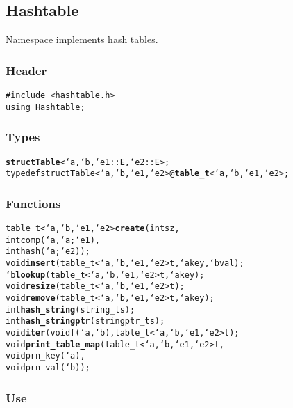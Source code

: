 \subsection{Hashtable}

Namespace  implements hash tables.

\subsubsection*{Header}
\begin{verbatim}
#include <hashtable.h>
using Hashtable;
\end{verbatim}

\subsubsection*{Types}
\begin{alltt}
\textbf{struct Table}<`a,`b,`e1::E,`e2::E>;
typedef struct Table<`a,`b,`e1,`e2> @\textbf{table_t}<`a,`b,`e1,`e2>;
\end{alltt}

\subsubsection*{Functions}

\begin{alltt}
table_t<`a,`b,`e1,`e2> \textbf{create}(int sz,
                              int comp(`a,`a;`e1),
                              int hash(`a;`e2));
void                   \textbf{insert}(table_t<`a,`b,`e1,`e2> t, `a key, `b val);
`b                     \textbf{lookup}(table_t<`a,`b,`e1,`e2> t, `a key);
void                   \textbf{resize}(table_t<`a,`b,`e1,`e2> t);
void                   \textbf{remove}(table_t<`a,`b,`e1,`e2> t, `a key);
int                    \textbf{hash_string}(string_t s);
int                    \textbf{hash_stringptr}(stringptr_t s);
void                   \textbf{iter}(void f(`a,`b), table_t<`a,`b,`e1,`e2> t);
void                   \textbf{print_table_map}(table_t<`a,`b,`e1,`e2> t,
                                       void prn_key(`a), 
                                       void prn_val(`b));
\end{alltt}

\subsubsection*{Use}

